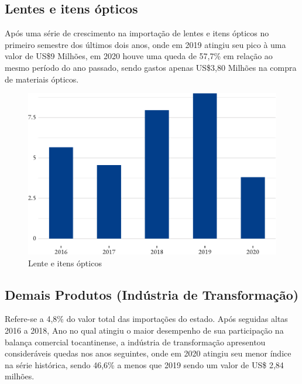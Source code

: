 \newpage 

\subsection{Lentes e itens ópticos}
\par Após uma série de crescimento na importação de lentes e itens ópticos no primeiro semestre dos últimos dois anos, onde em 2019 atingiu seu pico à uma valor de US\$9 Milhões, em 2020 houve uma queda de 57,7\% em relação ao mesmo período do ano passado, sendo gastos apenas US\$3,80 Milhões na compra de materiais ópticos. 

\begin{figure}[h] 
	\caption{Lente e itens ópticos}
	\includegraphics{fig/lentes1-1.pdf}
\end{figure}

\subsection{Demais Produtos (Indústria de Transformação)}
\par Refere-se a 4,8\% do valor total das importações do estado. Após seguidas altas 2016 a 2018, Ano no qual atingiu o maior desempenho de sua participação na balança comercial tocantinense, a indústria de transformação apresentou consideráveis quedas nos anos seguintes, onde em 2020 atingiu seu menor índice na série histórica, sendo 46,6\% a menos que 2019 sendo um valor de US\$ 2,84 milhões. 


